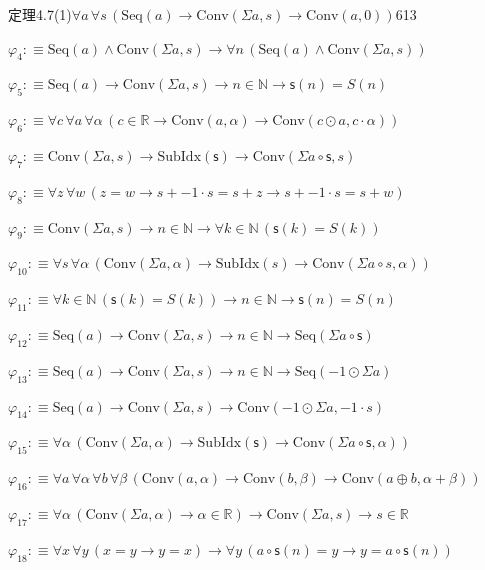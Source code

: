 \begin{fullproof}{定理4.7(1)}{$\forall a\,\forall s\,(\mathrm{Seq}(a) \to \mathrm{Conv}(\Sigma a,s) \to \mathrm{Conv}(a,0))$}{613}
\begin{abbrevlist}
\item $\varphi_{4} :\equiv \mathrm{Seq}(a) \land \mathrm{Conv}(\Sigma a,s) \to \forall n\,(\mathrm{Seq}(a) \land \mathrm{Conv}(\Sigma a,s))$
\item $\varphi_{5} :\equiv \mathrm{Seq}(a) \to \mathrm{Conv}(\Sigma a,s) \to n \in \mathbb{N} \to \mathsf{s}(n) = S(n)$
\item $\varphi_{6} :\equiv \forall c\,\forall a\,\forall \alpha\,(c \in \mathbb{R} \to \mathrm{Conv}(a,\alpha) \to \mathrm{Conv}(c \odot a,c \cdot \alpha))$
\item $\varphi_{7} :\equiv \mathrm{Conv}(\Sigma a,s) \to \mathrm{SubIdx}(\mathsf{s}) \to \mathrm{Conv}(\Sigma a \circ \mathsf{s},s)$
\item $\varphi_{8} :\equiv \forall z\,\forall w\,(z = w \to s + -1 \cdot s = s + z \to s + -1 \cdot s = s + w)$
\item $\varphi_{9} :\equiv \mathrm{Conv}(\Sigma a,s) \to n \in \mathbb{N} \to \forall k \in \mathbb{N}\,(\mathsf{s}(k) = S(k))$
\item $\varphi_{10} :\equiv \forall s\,\forall \alpha\,(\mathrm{Conv}(\Sigma a,\alpha) \to \mathrm{SubIdx}(s) \to \mathrm{Conv}(\Sigma a \circ s,\alpha))$
\item $\varphi_{11} :\equiv \forall k \in \mathbb{N}\,(\mathsf{s}(k) = S(k)) \to n \in \mathbb{N} \to \mathsf{s}(n) = S(n)$
\item $\varphi_{12} :\equiv \mathrm{Seq}(a) \to \mathrm{Conv}(\Sigma a,s) \to n \in \mathbb{N} \to \mathrm{Seq}(\Sigma a \circ \mathsf{s})$
\item $\varphi_{13} :\equiv \mathrm{Seq}(a) \to \mathrm{Conv}(\Sigma a,s) \to n \in \mathbb{N} \to \mathrm{Seq}(-1 \odot \Sigma a)$
\item $\varphi_{14} :\equiv \mathrm{Seq}(a) \to \mathrm{Conv}(\Sigma a,s) \to \mathrm{Conv}(-1 \odot \Sigma a,-1 \cdot s)$
\item $\varphi_{15} :\equiv \forall \alpha\,(\mathrm{Conv}(\Sigma a,\alpha) \to \mathrm{SubIdx}(\mathsf{s}) \to \mathrm{Conv}(\Sigma a \circ \mathsf{s},\alpha))$
\item $\varphi_{16} :\equiv \forall a\,\forall \alpha\,\forall b\,\forall \beta\,(\mathrm{Conv}(a,\alpha) \to \mathrm{Conv}(b,\beta) \to \mathrm{Conv}(a \oplus b,\alpha + \beta))$
\item $\varphi_{17} :\equiv \forall \alpha\,(\mathrm{Conv}(\Sigma a,\alpha) \to \alpha \in \mathbb{R}) \to \mathrm{Conv}(\Sigma a,s) \to s \in \mathbb{R}$
\item $\varphi_{18} :\equiv \forall x\,\forall y\,(x = y \to y = x) \to \forall y\,(a \circ \mathsf{s}(n) = y \to y = a \circ \mathsf{s}(n))$

\end{abbrevlist}
\end{fullproof}
